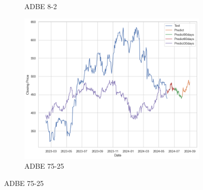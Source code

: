 \documentclass{ieeeojies}
\begin{document}
\begin{figure}[H]
\begin{subfigure}[b]{0.33\linewidth}
        \caption{ADBE 8-2}
        \label{fig:adbe-8-2}
    \end{subfigure}%
    \hfill
    \begin{subfigure}[b]{0.33\linewidth}
        \centering
        \includegraphics[width=\linewidth]{ETS Plot/ADBE_ETS_75_25.png}
        \caption{ADBE 75-25}
        \label{fig:adbe-75-25}
    \end{subfigure}
\end{figure}
 \vspace{-10pt}
\end{document}

